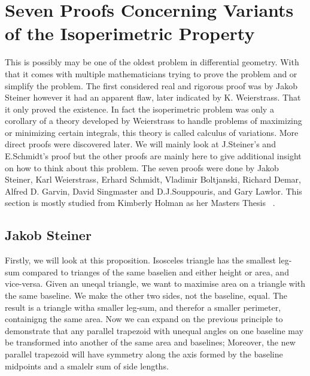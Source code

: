 \documentclass[a4paper]{book}
\begin{document}
\section{Seven Proofs Concerning Variants of the Isoperimetric Property}
This is possibly may be one of the oldest problem in differential geometry. With that it comes with multiple mathematicians trying to prove the problem and or simplify the problem. The first considered real and rigorous proof was by Jakob Steiner however it had an apparent flaw, later indicated by K. Weierstrass. That it only proved the existence. In fact the isoperimetric problem was only a corollary of a theory developed by Weierstrass to handle problems of maximizing or minimizing certain integrals, this theory is called calculus of variations. More direct proofs were discovered later. We will mainly look at J.Steiner's and E.Schmidt's proof but the other proofs are mainly here to give additional insight on how to think about this problem. The seven proofs were done by Jakob Steiner, Karl Weierstrass, Erhard Schmidt, Vladimir Boltjanski, Richard Demar, Alfred D. Garvin, David Singmaster and D.J.Souppouris, and Gary Lawlor. This section is mostly studied from Kimberly Holman as her Masters Thesis ~\cite{ holman2022isoperimetric}.

\subsection{Jakob Steiner}
Firstly, we will look at this proposition. Isosceles triangle has the smallest leg-sum compared to trianges of the same baselien and either height or area, and vice-versa. Given an uneqal triangle, we want to maximise area on a triangle with the same baseline. We make the other two sides, not the baseline, equal. The result is a triangle witha smaller leg-sum, and therefor a smaller perimeter, containigng the same area. Now we can expand on the previous principle to demonstrate that any parallel trapezoid with unequal angles on one baseline may be transformed into another of the same area and baselines; Moreover, the new parallel trapezoid will have symmetry along the axis formed by the baseline midpoints and a smalelr sum of side lengths.
\end{document}
